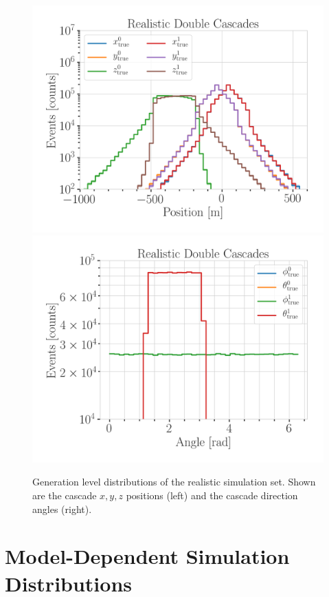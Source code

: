 \begin{figure}
    \centering
    \includegraphics[width=0.49\linewidth]{figures/model_independent_simulation/gen_level/194603_gen_level_1_d_distr_cascade_positions.png}
    \includegraphics[width=0.49\linewidth]{figures/model_independent_simulation/gen_level/194603_gen_level_1_d_distr_cascade_directions.png}
    \caption[Realistic model independent simulation generation level distributions]{Generation level distributions of the realistic simulation set. Shown are the cascade $x, y, z$ positions (left) and the cascade direction angles (right).}
\end{figure}


\section{Model-Dependent Simulation Distributions} 

